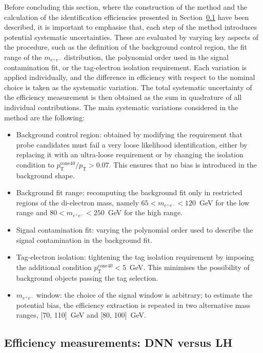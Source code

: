 Before concluding this section, where the construction of the \zmass method and the calculation of the identification efficiencies presented in Section~\ref{eff_meas} have been described, it is important to emphasise that, each step of the method introduces potential systematic uncertainties. These are evaluated by varying key aspects of the procedure, such as the definition of the background control region, the fit range of the $m_{e^+e^-}$ distribution, the polynomial order used in the signal contamination fit, or the tag-electron isolation requirement. 
Each variation is applied individually, and the difference in efficiency with respect to the nominal choice is taken as the systematic variation. The total systematic uncertainty of the efficiency measurement is then obtained as the sum in quadrature of all individual contributions. The main systematic variations considered in the \zmass method are the following:
\begin{itemize}
  \item Background control region: obtained by modifying the requirement that probe candidates must fail a very loose likelihood identification, either by replacing it with an ultra-loose requirement or by changing the isolation condition to $p_{\mathrm{T}}^{\mathrm{cone40}}/p_{\mathrm{T}} > 0.07$. This ensures that no bias is introduced in the background shape.
  \item Background fit range: recomputing the background fit only in restricted regions of the di-electron mass, namely $65 < m_{e^+e^-} < 120$~GeV for the low range and $80 < m_{e^+e^-} < 250$~GeV for the high range.
  \item Signal contamination fit: varying the polynomial order used to describe the signal contamination in the background fit.
  \item Tag-electron isolation: tightening the tag isolation requirement by imposing the additional condition $p_{\mathrm{T}}^{\mathrm{cone40}} < 5$~GeV. This minimises the possibility of background objects passing the tag selection.
  \item $m_{e^+e^-}$ window: the choice of the signal window is arbitrary; to estimate the potential bias, the efficiency extraction is repeated in two alternative mass ranges, [70, 110]~GeV and [80, 100]~GeV.
\end{itemize}

\subsection{Efficiency measurements: DNN versus LH}
\label{eff_meas}

